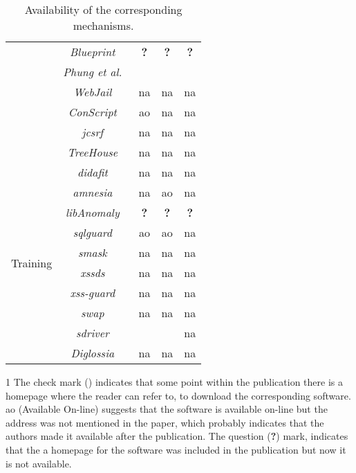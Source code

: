 \documentclass[conference]{IEEEtran}
\newcommand{\tick}{\ding{52}}
\begin{document}
\begin{table*}
\begin{threeparttable}
\begin{small}
{\begin{tabular}{l|c|ccc}
	&   {\it Blueprint}~\cite{LV09} & {\bf ?} & {\bf ?} & {\bf ?} \\
	&   {\it Phung et al.}~\cite{PSC09} & \tick & \tick & \tick \\
	&   {\it WebJail}~\cite{VDDPJ11} & {\sc na} & {\sc na} & {\sc na} \\
	&   {\it ConScript}~\cite{ML10} & {\sc ao} & {\sc na} & {\sc na} \\
	&   {\it j{\sc csrf}}~\cite{PS11} & {\sc na} & {\sc na} & {\sc na} \\
    &   {\it TreeHouse}~\cite{IW12} & {\sc na} & {\sc na} & {\sc na} \\
	\hline
	\hline  
        \multirow{11}{*}{Training}
    &   {\it {\sc didafit}}~\cite{LLW02} & {\sc na} & {\sc na} & {\sc na} \\
	&   {\it {\sc amnesia}}~\cite{HO05,HO06,HO05b} & {\sc na} & {\sc ao} & {\sc na} \\
	&   {\it libAnomaly}~\cite{VMV05} & {\bf ?} & {\bf ?} & {\bf ?} \\
	& 	{\it {\sc sqlg}uard}~\cite{BWS05} & {\sc ao} & {\sc ao} & {\sc na} \\
	& 	{\it {\sc sm}ask}~\cite{JB07} & {\sc na} & {\sc na} & {\sc na} \\
	& 	{\it {\sc xssds}}~\cite{JEP08} & {\sc na} & {\sc na} & {\sc na} \\
    & 	{\it {\sc xss-guard}}~\cite{BV08} & {\sc na} & {\sc na} & {\sc na} \\
    & 	{\it {\sc swap}}~\cite{WPLKK09} & {\sc na} & {\sc na} & {\sc na} \\
	& 	{\it {\sc sd}river}~\cite{MS09,MKS09,MKLS11} & \tick & \tick & {\sc na} \\
	& 	{\it Diglossia}~\cite{SMS13} & {\sc na} & {\sc na} & {\sc na} \\
	\hline
    \end{tabular}}
    \begin{tablenotes}
	\begin{footnotesize}
       \item[1] The check mark (\tick) indicates that some point within
       the publication there is a homepage where the reader can refer to, to
       download the corresponding software. {\sc ao} (Available On-line) suggests
       that the software is available on-line but the
       address was not mentioned in the paper, which probably indicates that
       the authors made it available after the publication. The question ({\bf ?})
       mark, indicates that the a homepage for the software was included
       in the publication but now it is not available.
	\end{footnotesize}
    \end{tablenotes}
    \caption{Availability of the corresponding mechanisms.}
    \label{tab:comp2}
    \end{small}
    \end{threeparttable}
\end{table*}



\end{document}

